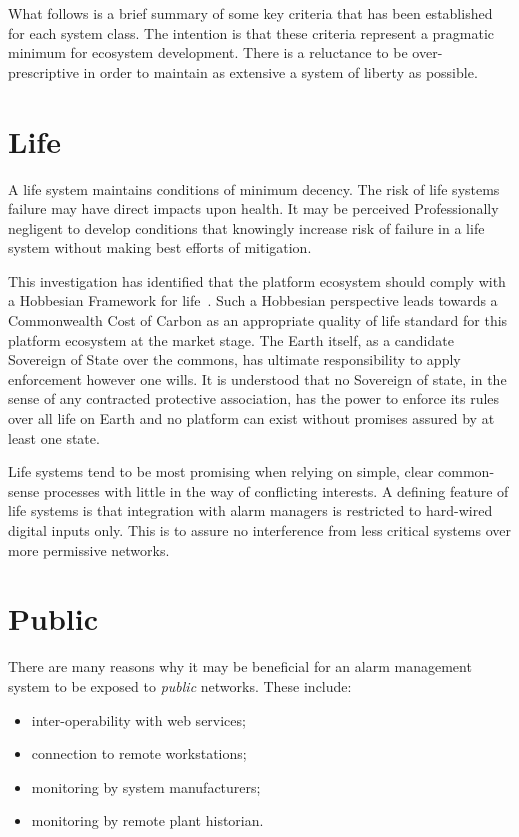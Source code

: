 \documentclass[11pt, oneside]{book}   	%
\begin{document}
\pagebreak

What follows is a brief summary of some key criteria that has been established for each system class.
The intention is that these criteria represent a pragmatic minimum for ecosystem development.
There is a reluctance to be over-prescriptive in order to maintain as extensive a system of liberty as possible.

\section{Life}
A life system maintains conditions of minimum decency.
The risk of life systems failure may have direct impacts upon health.
It may be perceived Professionally negligent to develop conditions that knowingly increase risk of failure in a life system without making best efforts of mitigation.\

This investigation has identified that the platform ecosystem should comply with a Hobbesian Framework for life~\cite{th1}.
Such a Hobbesian perspective leads towards a Commonwealth Cost of Carbon as an appropriate quality of life standard for this platform ecosystem at the market stage.
The Earth itself, as a candidate Sovereign of State over the commons, has ultimate responsibility to apply enforcement however one wills.
It is understood that no Sovereign of state, in the sense of any contracted protective association, has the power to enforce its rules over all life on Earth and no platform can exist without promises assured by at least one state.\

Life systems tend to be most promising when relying on simple, clear common-sense processes with little in the way of conflicting interests.
A defining feature of life systems is that integration with alarm managers is restricted to hard-wired digital inputs only.
This is to assure no interference from less critical systems over more permissive networks.\

\section{Public}

There are many reasons why it may be beneficial for an alarm management system to be exposed to \emph{public} networks.
These include:
\begin{itemize}
	\item inter-operability with web services; 
	\item connection to remote workstations;
	\item monitoring by system manufacturers;
	\item monitoring by remote plant historian.
\end{itemize}\
\end{document}
